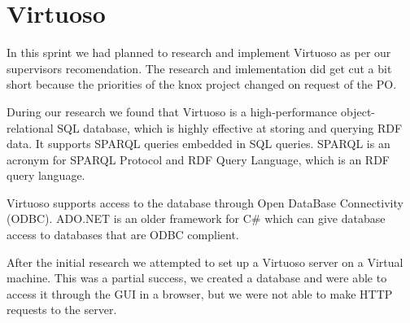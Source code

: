 \section{Virtuoso}
In this sprint we had planned to research and implement Virtuoso as per our supervisors recomendation.
The research and imlementation did get cut a bit short because the priorities of the knox project changed on request of the PO.

During our research we found that Virtuoso is a high-performance object-relational SQL database, which is highly effective at storing and querying RDF data. It supports SPARQL queries embedded in SQL queries. SPARQL is an acronym for SPARQL Protocol and RDF Query Language, which is an RDF query language.


Virtuoso supports access to the database through Open DataBase Connectivity (ODBC).
ADO.NET is an older framework for C\# which can give database access to databases that are ODBC complient.


After the initial research we attempted to set up a Virtuoso server on a Virtual machine. This was a partial success, we created a database and were able to access it through the GUI in a browser, but we were not able to make HTTP requests to the server.


